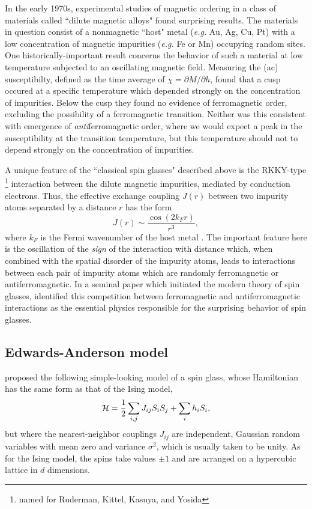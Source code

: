 In the early 1970s, experimental studies of magnetic ordering in a class of
materials called ``dilute magnetic alloys" found surprising results. The
materials in question consist of a nonmagnetic ``host" metal (\textit{e.g.} Au,
Ag, Cu, Pt) with a low concentration of magnetic impurities (\textit{e.g.} Fe
or Mn) occupying random sites. One historically-important result concerns the
behavior of such a material at low temperature subjected to an oscillating
magnetic field. Measuring the (ac) susceptibilty, defined as the time average
of $\chi = \partial M / \partial h$, \textcite{cannella1972magnetic} found that
a cusp occured at a specific temperature which depended strongly on the
concentration of impurities. Below the cusp they found no evidence of
ferromagnetic order, excluding the possibility of a ferromagnetic transition.
Neither was this consistent with emergence of \emph{anti}ferromagnetic order,
where we would expect a peak in the susceptibility at the transition
temperature, but this temperature should not to depend strongly on the
concentration of impurities.

A unique feature of the ``classical spin glasses" described above is the
RKKY-type%
\footnote{%
  named for Ruderman, Kittel, Kasuya, and Yosida
}
interaction between the dilute magnetic impurities, mediated by conduction
electrons. Thus, the effective exchange coupling $J(r)$ between two impurity
atoms separated by a distance $r$ has the form
\begin{equation}
  J(r) \sim \frac{\cos(2 k_F r)}{r^3},
\end{equation}
where $k_F$ is the Fermi wavenumber of the host metal
\autocite{binder1986spin}. The important feature here is the oscillation of the
\emph{sign} of the interaction with distance which, when combined with the
spatial disorder of the impurity atoms, leads to interactions between each pair
of impurity atoms which are randomly ferromagnetic or antiferromagnetic. In a
seminal paper which initiated the modern theory of spin glasses,
\textcite{edwards1975theory} identified this competition between ferromagnetic
and antiferromagnetic interactions as the essential physics responsible for the
surprising behavior of spin glasses.


\subsection{Edwards-Anderson model}
\label{sec:intro-ea}

\textcite{edwards1975theory} proposed the following simple-looking model of a
spin glass, whose Hamiltonian has the same form as that of the Ising model,
\begin{equation}
  \mathcal{H} = \frac{1}{2} \sum_{i,j} J_{ij} S_i S_j + \sum_i h_i S_i,
\end{equation}
but where the nearest-neighbor couplings $J_{ij}$ are independent, Gaussian
random variables with mean zero and variance $\sigma^2$, which is usually taken
to be unity. As for the Ising model, the spins take values $\pm 1$ and are
arranged on a hypercubic lattice in $d$ dimensions.

